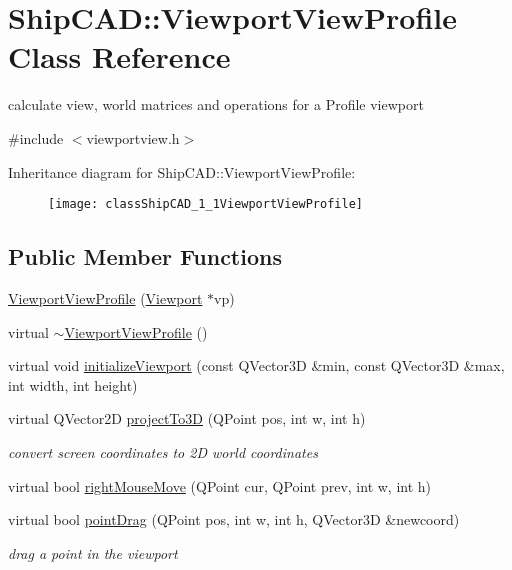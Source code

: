 \hypertarget{classShipCAD_1_1ViewportViewProfile}{}\section{Ship\+C\+AD\+:\+:Viewport\+View\+Profile Class Reference}
\label{classShipCAD_1_1ViewportViewProfile}


calculate view, world matrices and operations for a Profile viewport  




{\ttfamily \#include $<$viewportview.\+h$>$}

Inheritance diagram for Ship\+C\+AD\+:\+:Viewport\+View\+Profile\+:\begin{figure}[H]
\begin{center}
\leavevmode
\texttt{[image: classShipCAD\_1\_1ViewportViewProfile]}
\end{center}
\end{figure}
\subsection*{Public Member Functions}
\begin{DoxyCompactItemize}
\item 
\hyperlink{classShipCAD_1_1ViewportViewProfile_aff06a8bee0af9b969e4dc7373871700e}{Viewport\+View\+Profile} (\hyperlink{classShipCAD_1_1Viewport}{Viewport} $\ast$vp)
\item 
virtual \hyperlink{classShipCAD_1_1ViewportViewProfile_a1c3101fa8a458cf3908cd865349ace08}{$\sim$\+Viewport\+View\+Profile} ()
\item 
virtual void \hyperlink{classShipCAD_1_1ViewportViewProfile_ae8ac602b7c67fddbfce7ceeda85676b3}{initialize\+Viewport} (const Q\+Vector3D \&min, const Q\+Vector3D \&max, int width, int height)
\item 
virtual Q\+Vector2D \hyperlink{classShipCAD_1_1ViewportViewProfile_a6158e95a906d0b62064e72ead2263a73}{project\+To3D} (Q\+Point pos, int w, int h)
\begin{DoxyCompactList}\small\item\em convert screen coordinates to 2D world coordinates \end{DoxyCompactList}\item 
virtual bool \hyperlink{classShipCAD_1_1ViewportViewProfile_a8fccdc2ff4cb6021b6e810712d45b8f0}{right\+Mouse\+Move} (Q\+Point cur, Q\+Point prev, int w, int h)
\item 
virtual bool \hyperlink{classShipCAD_1_1ViewportViewProfile_abc8adc37b3539da20124a9d1930cfc92}{point\+Drag} (Q\+Point pos, int w, int h, Q\+Vector3D \&newcoord)
\begin{DoxyCompactList}\small\item\em drag a point in the viewport \end{DoxyCompactList}\end{DoxyCompactItemize}
